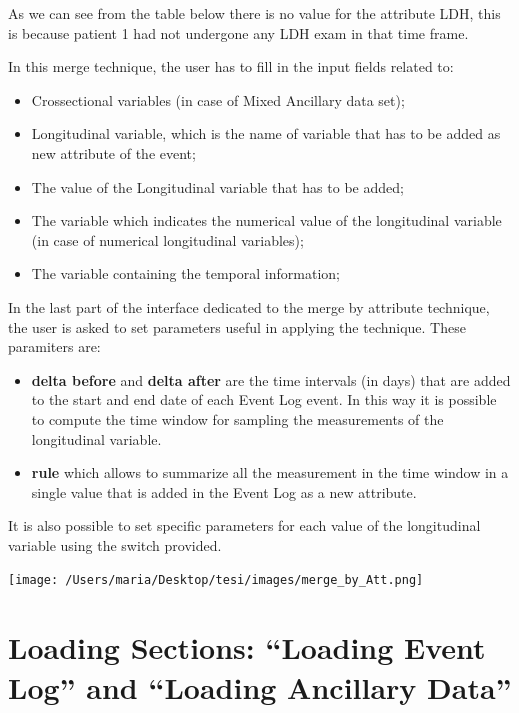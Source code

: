 \documentclass[
]{book}
\providecommand{\tightlist}{%
  \setlength{\itemsep}{0pt}\setlength{\parskip}{0pt}}
\begin{document}
As we can see from the table below there is no value for the attribute LDH, this is because patient 1 had not undergone any LDH exam in that time frame.

In this merge technique, the user has to fill in the input fields related to:

\begin{itemize}
\tightlist
\item
  Crossectional variables (in case of Mixed Ancillary data set);
\item
  Longitudinal variable, which is the name of variable that has to be added as new attribute of the event;
\item
  The value of the Longitudinal variable that has to be added;
\item
  The variable which indicates the numerical value of the longitudinal variable (in case of numerical longitudinal variables);
\item
  The variable containing the temporal information;
\end{itemize}

In the last part of the interface dedicated to the merge by attribute technique, the user is asked to set parameters useful in applying the technique. These paramiters are:

\begin{itemize}
\tightlist
\item
  \textbf{delta before} and \textbf{delta after} are the time intervals (in days) that are added to the start and end date of each Event Log event. In this way it is possible to compute the time window for sampling the measurements of the longitudinal variable.
\item
  \textbf{rule} which allows to summarize all the measurement in the time window in a single value that is added in the Event Log as a new attribute.
\end{itemize}

It is also possible to set specific parameters for each value of the longitudinal variable using the switch provided.

\texttt{[image: /Users/maria/Desktop/tesi/images/merge\_by\_Att.png]}

\hypertarget{loading-sections-loading-event-log-and-loading-ancillary-data}{%
\section{Loading Sections: ``Loading Event Log'' and ``Loading Ancillary Data''}\label{loading-sections-loading-event-log-and-loading-ancillary-data}}
\end{document}
